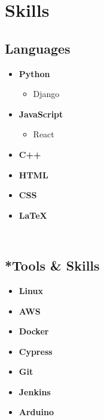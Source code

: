 \documentclass[]{morris-cv}
\begin{document}
%
%


%
%

%
%

\begin{minipage}[t]{0.25\textwidth} 


\section{Skills}
\subsection{Languages}
\begin{itemize}
    \setlength\itemsep{-0.2em}
        \item \textbf{Python}
            \begin{itemize}
                \setlength\itemsep{-0.17em}
                    \item Django
            \end{itemize}
        \item \textbf{JavaScript}
            \begin{itemize}
                \setlength\itemsep{-0.17em}
                    \item React
            \end{itemize}
        \item \textbf{C++}
        \item \textbf{HTML}
        \item \textbf{CSS}
        \item \textbf{LaTeX}
\end{itemize}

\subsection{\\*Tools \& Skills}
\begin{itemize}
    \setlength\itemsep{-0.2em}
        \item \textbf{Linux}
        \item \textbf{AWS}
        \item \textbf{Docker}
        \item \textbf{Cypress}
        \item \textbf{Git}
        \item \textbf{Jenkins}
        \item \textbf{Arduino}
\end{itemize}


\end{minipage}
\end{document}
